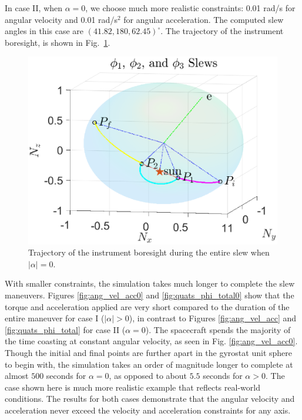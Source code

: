 \documentclass[letterpaper, paper,12pt]{AAS}		%
\begin{document}
In case II,  when $\alpha=0$, we choose much more realistic constraints: 0.01 rad/s for angular velocity and 0.01 rad/s$^2$ for angular acceleration. The computed slew angles in this case are $(41.82, 180, 62.45)^\circ$. The trajectory of the instrument boresight, is shown in Fig.~\ref{fig:phi1_phi2_phi3_alpha0}.
\begin{figure}[!h]
	\begin{center}
		\includegraphics[width=4.75in]{figures/alpha0/alpha0_phi1_phi2_phi3.eps}		
	\end{center}
\caption{Trajectory of the instrument boresight during the entire slew when $|\alpha|=0$.}
\label{fig:phi1_phi2_phi3_alpha0}
\end{figure}	
With smaller constraints, the simulation takes much longer to complete the slew maneuvers. Figures \ref{fig:ang_vel_acc0} and \ref{fig:quats_phi_total0} show that the torque and acceleration applied are very short compared to the duration of the entire maneuver for case I ($|\alpha| > 0$), in contrast to Figures \ref{fig:ang_vel_acc} and \ref{fig:quats_phi_total} for case II ($\alpha = 0$). The spacecraft spends the majority of the time coasting at constant angular velocity, as seen in Fig. \ref{fig:ang_vel_acc0}. Though the initial and final points are further apart in the gyrostat unit sphere to begin with, the simulation takes an order of magnitude longer to complete at almost $500$ seconds for $\alpha = 0$, as opposed to about $5.5$ seconds for $\alpha > 0$. The case shown here is much more realistic example that reflects real-world conditions. The results for both cases demonstrate that the angular velocity and acceleration never exceed the velocity and acceleration constraints for any axis. 	
\end{document}
